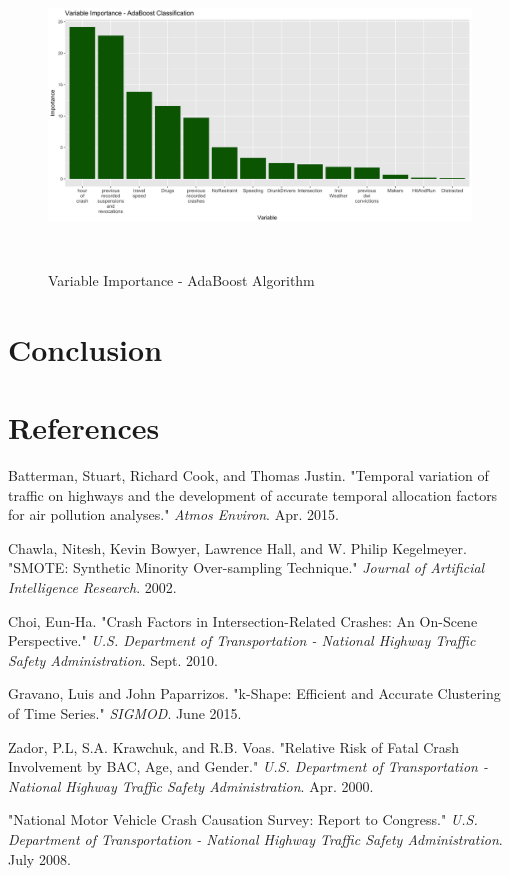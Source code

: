 \documentclass[11pt, oneside,titlepage]{article}   	%
\begin{document}
\begin{figure}[H]
\centering
  \includegraphics[width=15cm,height=8cm,keepaspectratio]{ImportancePlot_ADABoost.png}
\caption{Variable Importance - AdaBoost Algorithm}
\end{figure}






\section*{Conclusion}

\section*{References}
\begin{hangparas}{1.27cm}{1}
Batterman, Stuart, Richard Cook, and Thomas Justin. "Temporal variation of traffic on highways and the development of accurate temporal allocation factors for air pollution analyses." \textit{Atmos Environ}. Apr. 2015.

Chawla, Nitesh, Kevin Bowyer, Lawrence Hall, and W. Philip Kegelmeyer. "SMOTE: Synthetic Minority Over-sampling Technique." \textit{Journal of Artificial Intelligence Research}. 2002.

Choi, Eun-Ha. "Crash Factors in Intersection-Related Crashes: An On-Scene Perspective." \textit{U.S. Department of Transportation - National Highway Traffic Safety Administration}. Sept. 2010.

Gravano, Luis and John Paparrizos. "k-Shape: Efficient and Accurate Clustering of Time Series." \textit{SIGMOD}. June 2015.

Zador, P.L, S.A. Krawchuk, and R.B. Voas. "Relative Risk of Fatal Crash Involvement by BAC, Age, and Gender." \textit{U.S. Department of Transportation - National Highway Traffic Safety Administration}. Apr. 2000.

"National Motor Vehicle Crash Causation Survey: Report to Congress." \textit{U.S. Department of Transportation - National Highway Traffic Safety Administration}. July 2008.


\end{hangparas}
\end{document}
